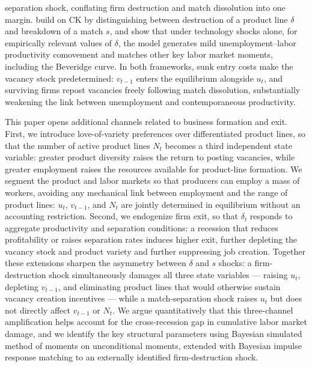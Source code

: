 \documentclass[authoryear, review, 12pt]{elsarticle}
\begin{document}
	separation shock, conflating firm destruction and match dissolution 
	into one margin. \citet{gabrovski_2025} build on CK by distinguishing 
	between destruction of a product line $\delta$ and breakdown of a 
	match $s$, and show that under technology shocks alone, for 
	empirically relevant values of $\delta$, the model generates mild 
	unemployment--labor productivity comovement and matches other key 
	labor market moments, including the Beveridge curve. In both 
	frameworks, sunk entry costs make the vacancy stock predetermined: 
	$v_{t-1}$ enters the equilibrium alongside $u_t$, and surviving 
	firms repost vacancies freely following match dissolution, 
	substantially weakening the link between unemployment and 
	contemporaneous productivity.
	
	This paper opens additional channels related to business formation 
	and exit. First, we introduce love-of-variety preferences over 
	differentiated product lines, so that the number of active product 
	lines $N_t$ becomes a third independent state variable: greater 
	product diversity raises the return to posting vacancies, while 
	greater employment raises the resources available for product-line 
	formation. We segment the product and labor markets so that 
	producers can employ a mass of workers, avoiding any mechanical link 
	between employment and the range of product lines: $u_t$, $v_{t-1}$, 
	and $N_t$ are jointly determined in equilibrium without an accounting 
	restriction. Second, we endogenize firm exit, so that $\delta_t$ 
	responds to aggregate productivity and separation conditions: a 
	recession that reduces profitability or raises separation rates 
	induces higher exit, further depleting the vacancy stock and product variety and further suppressing job creation. Together these 
	extensions sharpen the asymmetry between $\delta$ and $s$ shocks: a firm-destruction shock simultaneously damages all three state variables --- raising $u_t$, depleting $v_{t-1}$, and eliminating product lines that would otherwise sustain vacancy creation 
	incentives --- while a match-separation shock raises $u_t$ but does not directly affect $v_{t-1}$ or $N_t$. We argue quantitatively that this three-channel amplification helps account for the cross-recession gap in cumulative labor market damage, and we identify the key 
	structural parameters using Bayesian simulated method of moments on unconditional moments, extended with Bayesian impulse response 
	matching to an externally identified firm-destruction shock.
	
\end{document}
